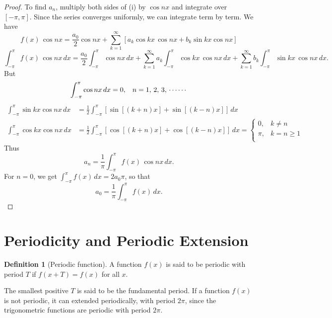 \documentclass[12pt,a4paper]{report}
\theoremstyle{definition}
\newtheorem{defn}[thm]{Definition}
\theoremstyle{plain}
\begin{document}
\begin{proof}
To find $a_n$, multiply both sides of (i) by $\cos nx$ and integrate over $[-\pi, \pi]$. Since the series converges uniformly, we can integrate term by term. We have
$$f(x) \, \cos nx  = \frac{a_0}{2}\cos nx + \sum_{k = 1}^{\infty}\left[a_k \cos kx\, \cos nx + b_k \sin kx \cos nx\right]$$
$$\int_{-\pi}^{\pi}f(x)\, \cos nx\, dx = \frac{a_0}{2}\int_{-\pi}^{\pi}\cos nx \, dx + \sum_{k=1}^{\infty}a_k\int_{-\pi}^{\pi}\cos kx\, \cos nx \, dx + \sum_{k = 1}^{\infty}b_k\int_{-\pi}^{\pi}\sin kx\, \cos nx\, dx.$$
But 
$$\int_{-\pi}^{\pi}\cos nx\, dx= 0, \hspace{0.3cm} n = 1,\, 2, \, 3, \, \cdots\cdots$$
\begin{align*}
\int_{-\pi}^{\pi}\sin kx \cos nx\, dx & = \frac{1}{2}\int_{-\pi}^{\pi}\left[\sin [(k+n)x] + \sin [(k -n)x]\right]\, dx\\
\int^{\pi}_{-\pi}\cos kx \cos nx\, dx & = \frac{1}{2}\int_{-\pi}^{\pi}\left[\cos [(k+n)x] + \cos [(k-n)x]\right]\, dx = \begin{cases}
0, & k\neq n\\
\pi, & k = n\geq 1\\
\end{cases}
\end{align*}
Thus
$$a_n = \frac{1}{\pi}\int_{-\pi}^{\pi}f(x)\, \cos nx\, dx.$$
For $n=0$, we get $\int_{-\pi}^{\pi}f(x)\, dx  = 2a_0\pi$, so that $$a_0 = \frac{1}{\pi}\int_{-\pi}^{\pi} f(x)\, dx.$$
\end{proof}














\section{Periodicity and Periodic Extension}

\begin{defn}[Periodic function]
A function $f(x)$ is said to be periodic with period $T$ if $f(x + T) = f(x)$ for all $x$.
\end{defn}

The smallest positive $T$ is said to be the fundamental period.
If a function $f(x)$ is not periodic, it can extended periodically, with period $2\pi$, since the trigonometric functions are periodic with period $2\pi$.
\end{document}
